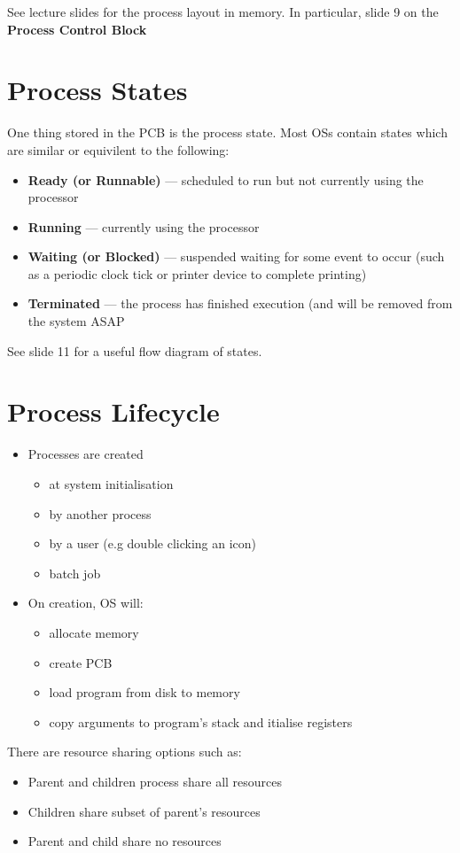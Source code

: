 \documentclass{article}
\begin{document}
See lecture slides for the process layout in memory.
In particular, slide 9 on the \textbf{Process Control Block}

\section{Process States}
One thing stored in the PCB is the process state.
Most OSs contain states which are similar or equivilent to the following:
\begin{itemize}
	\item \textbf{Ready (or Runnable)} --- scheduled to run but not currently using the processor
	\item \textbf{Running} --- currently using the processor
	\item \textbf{Waiting (or Blocked)} --- suspended waiting for some event to occur (such as a periodic clock tick or printer device to complete printing)
	\item \textbf{Terminated} --- the process has finished execution (and will be removed from the system ASAP
\end{itemize}

See slide 11 for a useful flow diagram of states.

\section{Process Lifecycle}
\begin{itemize}
	\item Processes are created
		\begin{itemize}
			\item at system initialisation
			\item by another process
			\item by a user (e.g double clicking an icon)
			\item batch job
		\end{itemize}
	\item On creation, OS will:
		\begin{itemize}
			\item allocate memory
			\item create PCB
			\item load program from disk to memory
			\item copy arguments to program's stack and itialise registers
		\end{itemize}
\end{itemize}

There are resource sharing options such as:
\begin{itemize}
	\item Parent and children process share all resources
	\item Children share subset of parent's resources
	\item Parent and child share no resources
\end{itemize}
\end{document}
